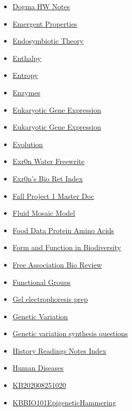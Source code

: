 \documentclass[11pt]{article}
\begin{document}
\begin{itemize}
\begin{itemize}
\item \href{bio101/KBBIO101DogmaNuecleotidesNotes.org}{Dogma HW Notes}
\item \href{bio101/KB20200826090938.org}{Emergent Properties}
\item \href{bio101/KBhBIO101Endosymbiotic.org}{Endosymbiotic Theory}
\item \href{bio101/KBhBIO101Enthalpy.org}{Enthalpy}
\item \href{bio101/KBhBIO101Entropy.org}{Entropy}
\item \href{bio101/KBhBIO101Enzymes.org}{Enzymes}
\item \href{bio101/KBBIO101GeneExpression.org}{Eukaryotic Gene Expression}
\item \href{bio101/KBBIO101GeneExpression2.org}{Eukaryotic Gene Expression}
\item \href{bio101/KBhBIO101Evolution.org}{Evolution}
\item \href{bio101/KBe20bio101retWaterFreewrite.org}{Exr0n Water Freewrite}
\item \href{bio101/KBe20bio101retIndex.org}{Exr0n's Bio Ret Index}
\item \href{bio101/KBe20bio201retFallProject1.org}{Fall Project 1 Master Doc}
\item \href{bio101/KBhBIO101FluidMosaic.org}{Fluid Mosaic Model}
\item \href{bio101/KBe20bio101retFoodDataProteinAminos.org}{Food Data Protein Amino Acids}
\item \href{bio101/KBhBIO101Rosalind.org}{Form and Function in Biodiversity}
\item \href{bio101/KBFreeAssociationBioReviewHuxley.org}{Free Association Bio Review}
\item \href{bio101/KBhBIO101FunctionalGroups.org}{Functional Groups}
\item \href{bio101/KBxGelElectrophoresisPrep.org}{Gel electrophoresis prep}
\item \href{bio101/KBhBIO101GeneticVariation.org}{Genetic Variation}
\item \href{bio101/KBxGeneticVariationMA.org}{Genetic variation synthesis questions}
\item \href{bio101/KB20200826173039.org}{History Readings Notes Index}
\item \href{bio101/KBhBIO101HumanDiseases.org}{Human Diseases}
\item \href{bio101/KB202008251020.org}{KB202008251020}
\item \href{bio101/KBBIO101EpigeneticHammering.org}{KBBIO101EpigeneticHammering}

\end{itemize}
\end{itemize}
\end{document}
